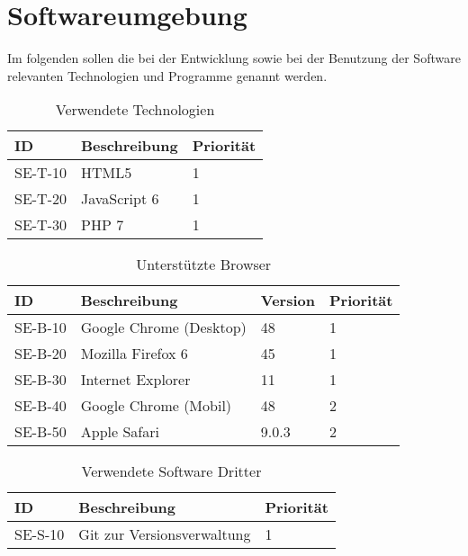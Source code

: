 
\chapter{Softwareumgebung}
Im folgenden sollen die bei der Entwicklung sowie bei der Benutzung der Software relevanten Technologien und Programme genannt werden.

\begin{table}[H]
\caption{Verwendete Technologien}
\label{softwareumgebung:technologien}
\begin{tabularx}{\textwidth}{|l|X|l|}
\toprule
\textbf{ID} & \textbf{Beschreibung} & \textbf{Priorität}\\
\endhead
\hline
SE-T-10 & HTML5 & 1 \\
SE-T-20 & JavaScript 6 & 1 \\
SE-T-30 & PHP 7 & 1\\
\hline
\end{tabularx}
\end{table}

\begin{table}[H]
\caption{Unterstützte Browser}
\label{softwareumgebung:browser}
\begin{tabularx}{\textwidth}{|l|l|l|l|}
\toprule
\textbf{ID} & \textbf{Beschreibung} & \textbf{Version} & \textbf{Priorität}\\
\endhead
\hline
SE-B-10 & Google Chrome (Desktop) & 48 & 1 \\
SE-B-20 & Mozilla Firefox 6 & 45 & 1 \\
SE-B-30 & Internet Explorer & 11 & 1\\
SE-B-40 & Google Chrome (Mobil) & 48 & 2\\
SE-B-50 & Apple Safari & 9.0.3 & 2\\
\hline
\end{tabularx}
\end{table}

\begin{table}[H]
\caption{Verwendete Software Dritter}
\label{softwareumgebung:sonstige}
\begin{tabularx}{\textwidth}{|l|X|l|}
\toprule
\textbf{ID} & \textbf{Beschreibung} & \textbf{Priorität}\\
\endhead
\hline
SE-S-10 & Git zur Versionsverwaltung & 1 \\
\hline
\end{tabularx}
\end{table}